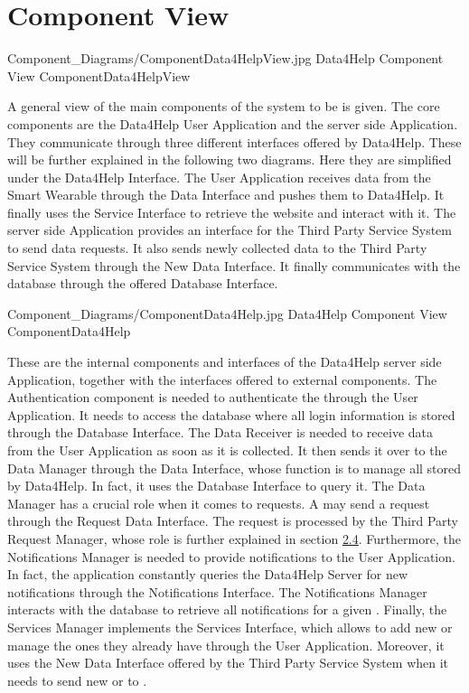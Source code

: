 \documentclass[../../DD.tex]{subfiles}
\begin{document}
\section{Component View}

	\image {13cm} {Component_Diagrams/ComponentData4HelpView.jpg} {Data4Help Component View} {ComponentData4HelpView}

	A general view of the main components of the system to be is given. The core components are the Data4Help User Application and the server side Application. They communicate through three different interfaces offered by Data4Help. These will be further explained in the following two diagrams. Here they are simplified under the Data4Help Interface. The User Application receives data from the Smart Wearable through the Data Interface and pushes them to Data4Help. It finally uses the Service Interface to retrieve the  website and interact with it.
	The server side Application provides an interface for the Third Party Service System to send data requests. It also sends newly collected data to the Third Party Service System through the New Data Interface. It finally communicates with the database through the offered Database Interface.

	\image {13cm} {Component_Diagrams/ComponentData4Help.jpg} {Data4Help Component View} {ComponentData4Help}

	These are the internal components and interfaces of the Data4Help server side Application, together with the interfaces offered to external components.
	The Authentication component is needed to authenticate the  through the User Application. It needs to access the database where all login information is stored through the Database Interface.
	The Data Receiver is needed to receive data from the User Application as soon as it is collected. It then sends it over to the Data Manager through the Data Interface, whose function is to manage all  stored by Data4Help. In fact, it uses the Database Interface to query it.
	The Data Manager has a crucial role when it comes to  requests. A  may send a request through the Request Data Interface. The request is processed by the Third Party Request Manager, whose role is further explained in section \hyperref[sect:2.4]{2.4}.
	Furthermore, the Notifications Manager is needed to provide notifications to the User Application. In fact, the application constantly queries the Data4Help Server for new notifications through the Notifications Interface. The Notifications Manager interacts with the database to retrieve all notifications for a given .
	Finally, the Services Manager implements the Services Interface, which allows  to add new  or manage the ones they already have through the User Application. Moreover, it uses the New Data Interface offered by the Third Party Service System when it needs to send new  or  to .
\end{document}
